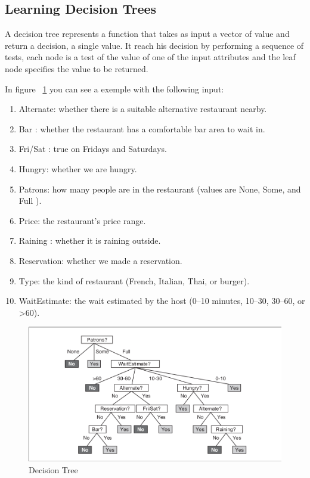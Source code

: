 \subsection{Learning Decision Trees}
A decision tree represents a function that takes as input a vector of value and return a decision, a single value. It reach his decision
by performing a sequence of tests, each node is a test of the value of one of the input attributes and the leaf node specifies the value to be
returned.

In figure ~\ref{decisionTree} you can see a exemple with the following input:
\begin{enumerate}
\item Alternate: whether there is a suitable alternative restaurant nearby.
\item Bar : whether the restaurant has a comfortable bar area to wait in.
\item Fri/Sat : true on Fridays and Saturdays.
\item Hungry: whether we are hungry.
\item Patrons: how many people are in the restaurant (values are None, Some, and Full ).
\item Price: the restaurant’s price range.
\item Raining : whether it is raining outside.
\item Reservation: whether we made a reservation.
\item Type: the kind of restaurant (French, Italian, Thai, or burger).
\item WaitEstimate: the wait estimated by the host (0–10 minutes, 10–30, 30–60, or >60).
\end{enumerate} 

\begin{figure}[h]
    \centering
    \includegraphics[width=14cm]{decisionTree.png}
    \caption{Decision Tree}
    \label{decisionTree}
\end{figure}

